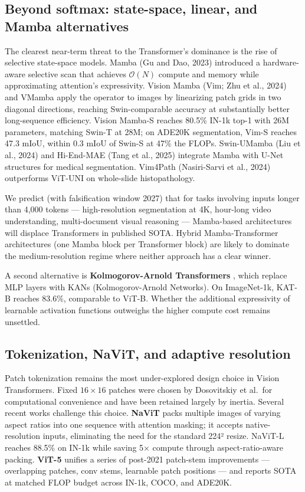 \documentclass{article}
\begin{document}
\subsection{Beyond softmax: state-space, linear, and Mamba alternatives}\label{beyond-softmax-state-space-linear-and-mamba-alternatives}

The clearest near-term threat to the Transformer's dominance is the rise of selective state-space models. Mamba (Gu and Dao, 2023) introduced a hardware-aware selective scan that achieves \(\mathcal{O}(N)\) compute and memory while approximating attention's expressivity. Vision Mamba (Vim; Zhu et al., 2024) and VMamba apply the operator to images by linearizing patch grids in two diagonal directions, reaching Swin-comparable accuracy at substantially better long-sequence efficiency. Vision Mamba-S reaches 80.5\% IN-1k top-1 with 26M parameters, matching Swin-T at 28M; on ADE20K segmentation, Vim-S reaches 47.3 mIoU, within 0.3 mIoU of Swin-S at 47\% the FLOPs. Swin-UMamba (Liu et al., 2024) and Hi-End-MAE (Tang et al., 2025) integrate Mamba with U-Net structures for medical segmentation. Vim4Path (Nasiri-Sarvi et al., 2024) outperforms ViT-UNI on whole-slide histopathology.

We predict (with falsification window 2027) that for tasks involving inputs longer than 4,000 tokens --- high-resolution segmentation at 4K, hour-long video understanding, multi-document visual reasoning --- Mamba-based architectures will displace Transformers in published SOTA. Hybrid Mamba-Transformer architectures (one Mamba block per Transformer block) are likely to dominate the medium-resolution regime where neither approach has a clear winner.

A second alternative is \textbf{Kolmogorov-Arnold Transformers} \citep{yang2024kolmogorovarnoldtr}, which replace MLP layers with KANs (Kolmogorov-Arnold Networks). On ImageNet-1k, KAT-B reaches 83.6\%, comparable to ViT-B. Whether the additional expressivity of learnable activation functions outweighs the higher compute cost remains unsettled.

\subsection{Tokenization, NaViT, and adaptive resolution}\label{tokenization-navit-and-adaptive-resolution}

Patch tokenization remains the most under-explored design choice in Vision Transformers. Fixed \(16 \times 16\) patches were chosen by Dosovitskiy et al.~for computational convenience and have been retained largely by inertia. Several recent works challenge this choice. \textbf{NaViT} \citep{dehghani2023scalingvisiontrans} packs multiple images of varying aspect ratios into one sequence with attention masking; it accepts native-resolution inputs, eliminating the need for the standard 224² resize. NaViT-L reaches 88.5\% on IN-1k while saving 5× compute through aspect-ratio-aware packing. \textbf{ViT-5} \citep{wang2026vit5visiontransfor} unifies a series of post-2021 patch-stem improvements --- overlapping patches, conv stems, learnable patch positions --- and reports SOTA at matched FLOP budget across IN-1k, COCO, and ADE20K.
\end{document}
